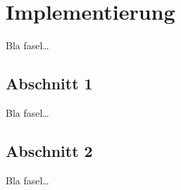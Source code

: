 
\chapter{Implementierung}
\label{ch:Implementierung}
Bla fasel\ldots

\section{Abschnitt 1}
\label{ch:Implementierung:sec:Abschnitt1}

Bla fasel\ldots

\section{Abschnitt 2}
\label{ch:Implementierung:sec:Abschnitt2}

Bla fasel\ldots


